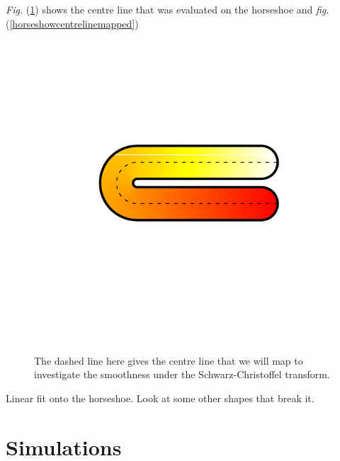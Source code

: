 \documentclass[a4paper,10pt]{amsart}
\newcommand{\sch}{Schwarz-Christoffel }
\newcommand{\fig}[1]{\emph{fig.} (\ref{#1})}
\newcommand{\Fig}[1]{\emph{Fig.} (\ref{#1})}
\begin{document}
\Fig{horseshoecentreline} shows the centre line that was evaluated on the horseshoe and \fig{horseshowcentrelinemapped}


\begin{figure}
\centering
\includegraphics[trim=0.5in 1in 0in 1in]{figs/horseshoecentreline.pdf} \\
\caption{The dashed line here gives the centre line that we will map to investigate the smoothness under the \sch transform.}
\label{horseshoecentreline}
\end{figure}



Linear fit onto the horseshoe.
Look at some other shapes that break it.


\section{Simulations}
\end{document}
